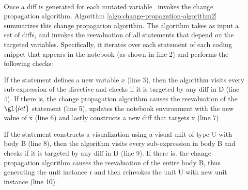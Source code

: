 \\
Once a diff is generated for each mutated variable \projname\ invokes the change propagation algorithm. Algorithm \ref{algo:change-propagation-algorithm2} summarizes this change propagation algorithm. The algorithm takes as input a set of diffs, and invokes the reevaluation of all statements that depend on the targeted variables. Specifically, it iterates over each statement of each coding snippet that appears in the notebook (as shown in line 2) and performs the following checks:

\begin{compactitem}

\item If the statement defines a new variable $x$ (line 3), then the algorithm visits every sub-expression of the  directive and checks if it is targeted by any diff in D (line 4). If there is, the change propagation algorithm causes the reevaluation of the $\gl{let}$ statement (line 5), updates the notebook environment with the new value of x (line 6) and lastly constructs a new diff that targets x (line 7)

\item If the statement constructs a visualization using a visual unit of type U with body B (line 8), then the algorithm visits every sub-expression in body B and checks if it is targeted by any diff in D (line 9). If there is, the change propagation algorithm causes the reevaluation of the entire body B, thus generating the unit instance r and then reinvokes the unit U with new unit instance (line 10).



\end{compactitem}

